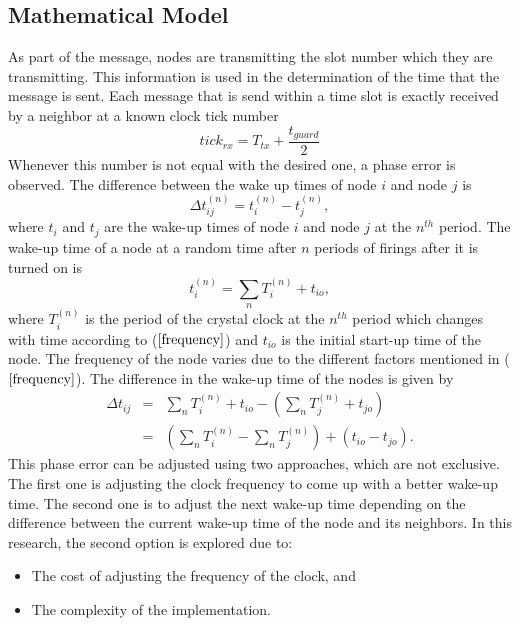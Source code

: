 \documentclass[journal]{IEEEtran}
\begin{document}
\subsection{\textbf{Mathematical Model}}
\noindent As part of the message, nodes are transmitting the slot number which they are transmitting. This information is used in the determination of the time that the message is sent. Each message
that is send within a time slot is exactly received by a neighbor at
a known clock tick number
\begin{equation}
tick_{rx} = T_{tx}+ \frac{t_{guard}}{2} \label{tick}
\end{equation}
Whenever this number is not equal with the desired one, a phase error is observed. \newline
The difference between the wake up times of node $i$ and node $j$ is
\begin{equation}
\Delta t_{ij}^{(n)} = t_i^{(n)} - t_j^{(n)} ,
\end{equation}
where $t_i$ and $t_j$ are the wake-up times of node $i$ and node $j$
at the $n^{th}$ period. \newline \noindent
The wake-up time of a node at a random time after $n$ periods of firings after it is turned on is
\begin{equation}
t_i^{(n)} = \sum_{n} T_i^{(n)} + t_{io},
\end{equation}
where  $T_i^{(n)}$ is the period of the crystal clock at the $n^{th}$ period which changes with time according to ($\ref{frequency}$) and $t_{io}$ is the initial start-up time of the node. The frequency of the node varies due to the different factors mentioned in ($\ref{frequency}$). \newline
The difference in the wake-up time of the nodes is given by
\begin{eqnarray}
\Delta t_{ij} & = & \sum_{n}T_i^{(n)} + t_{io}- (\sum_{n}T_j^{(n)} +
t_{jo}) \\ &=& (\sum_{n}T_i^{(n)} - \sum_{n}T_j^{(n)}) +
(t_{io}-t_{jo}).
\end{eqnarray}
This phase error can be adjusted using two approaches, which are not exclusive. The first
one is adjusting the clock frequency to come up with a better
wake-up time. The second one is to adjust the next wake-up time
depending on the difference between the current wake-up time of the
node and its neighbors. In this research, the second option is
explored due to:
\begin{itemize}
\item The cost of adjusting the frequency of the clock, and
\item The complexity of the implementation.
\end{itemize}
\end{document}
